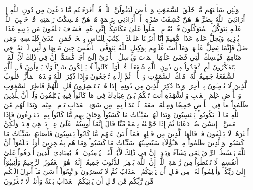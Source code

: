 وَلَئِن سَأَلۡتَهُم مَّنۡ خَلَقَ ٱلسَّمَٰوَٰتِ وَٱلۡأَرۡضَ لَيَقُولُنَّ ٱللَّهُۚ قُلۡ أَفَرَءَيۡتُم مَّا تَدۡعُونَ مِن دُونِ ٱللَّهِ إِنۡ أَرَادَنِيَ ٱللَّهُ بِضُرٍّ هَلۡ هُنَّ كَٰشِفَٰتُ ضُرِّهِۦٓ أَوۡ أَرَادَنِي بِرَحۡمَةٍ هَلۡ هُنَّ مُمۡسِكَٰتُ رَحۡمَتِهِۦۚ قُلۡ حَسۡبِيَ ٱللَّهُۖ عَلَيۡهِ يَتَوَكَّلُ ٱلۡمُتَوَكِّلُونَ
قُلۡ يَٰقَوۡمِ ٱعۡمَلُواْ عَلَىٰ مَكَانَتِكُمۡ إِنِّي عَٰمِلٞۖ فَسَوۡفَ تَعۡلَمُونَ
مَن يَأۡتِيهِ عَذَابٞ يُخۡزِيهِ وَيَحِلُّ عَلَيۡهِ عَذَابٞ مُّقِيمٌ
إِنَّآ أَنزَلۡنَا عَلَيۡكَ ٱلۡكِتَٰبَ لِلنَّاسِ بِٱلۡحَقِّۖ فَمَنِ ٱهۡتَدَىٰ فَلِنَفۡسِهِۦۖ وَمَن ضَلَّ فَإِنَّمَا يَضِلُّ عَلَيۡهَاۖ وَمَآ أَنتَ عَلَيۡهِم بِوَكِيلٍ
ٱللَّهُ يَتَوَفَّى ٱلۡأَنفُسَ حِينَ مَوۡتِهَا وَٱلَّتِي لَمۡ تَمُتۡ فِي مَنَامِهَاۖ فَيُمۡسِكُ ٱلَّتِي قَضَىٰ عَلَيۡهَا ٱلۡمَوۡتَ وَيُرۡسِلُ ٱلۡأُخۡرَىٰٓ إِلَىٰٓ أَجَلٖ مُّسَمًّىۚ إِنَّ فِي ذَٰلِكَ لَأٓيَٰتٖ لِّقَوۡمٖ يَتَفَكَّرُونَ
أَمِ ٱتَّخَذُواْ مِن دُونِ ٱللَّهِ شُفَعَآءَۚ قُلۡ أَوَلَوۡ كَانُواْ لَا يَمۡلِكُونَ شَيۡـٔٗا وَلَا يَعۡقِلُونَ
قُل لِّلَّهِ ٱلشَّفَٰعَةُ جَمِيعٗاۖ لَّهُۥ مُلۡكُ ٱلسَّمَٰوَٰتِ وَٱلۡأَرۡضِۖ ثُمَّ إِلَيۡهِ تُرۡجَعُونَ
وَإِذَا ذُكِرَ ٱللَّهُ وَحۡدَهُ ٱشۡمَأَزَّتۡ قُلُوبُ ٱلَّذِينَ لَا يُؤۡمِنُونَ بِٱلۡأٓخِرَةِۖ وَإِذَا ذُكِرَ ٱلَّذِينَ مِن دُونِهِۦٓ إِذَا هُمۡ يَسۡتَبۡشِرُونَ
قُلِ ٱللَّهُمَّ فَاطِرَ ٱلسَّمَٰوَٰتِ وَٱلۡأَرۡضِ عَٰلِمَ ٱلۡغَيۡبِ وَٱلشَّهَٰدَةِ أَنتَ تَحۡكُمُ بَيۡنَ عِبَادِكَ فِي مَا كَانُواْ فِيهِ يَخۡتَلِفُونَ
وَلَوۡ أَنَّ لِلَّذِينَ ظَلَمُواْ مَا فِي ٱلۡأَرۡضِ جَمِيعٗا وَمِثۡلَهُۥ مَعَهُۥ لَٱفۡتَدَوۡاْ بِهِۦ مِن سُوٓءِ ٱلۡعَذَابِ يَوۡمَ ٱلۡقِيَٰمَةِۚ وَبَدَا لَهُم مِّنَ ٱللَّهِ مَا لَمۡ يَكُونُواْ يَحۡتَسِبُونَ
وَبَدَا لَهُمۡ سَيِّـَٔاتُ مَا كَسَبُواْ وَحَاقَ بِهِم مَّا كَانُواْ بِهِۦ يَسۡتَهۡزِءُونَ
فَإِذَا مَسَّ ٱلۡإِنسَٰنَ ضُرّٞ دَعَانَا ثُمَّ إِذَا خَوَّلۡنَٰهُ نِعۡمَةٗ مِّنَّا قَالَ إِنَّمَآ أُوتِيتُهُۥ عَلَىٰ عِلۡمِۭۚ بَلۡ هِيَ فِتۡنَةٞ وَلَٰكِنَّ أَكۡثَرَهُمۡ لَا يَعۡلَمُونَ
قَدۡ قَالَهَا ٱلَّذِينَ مِن قَبۡلِهِمۡ فَمَآ أَغۡنَىٰ عَنۡهُم مَّا كَانُواْ يَكۡسِبُونَ
فَأَصَابَهُمۡ سَيِّـَٔاتُ مَا كَسَبُواْۚ وَٱلَّذِينَ ظَلَمُواْ مِنۡ هَـٰٓؤُلَآءِ سَيُصِيبُهُمۡ سَيِّـَٔاتُ مَا كَسَبُواْ وَمَا هُم بِمُعۡجِزِينَ
أَوَلَمۡ يَعۡلَمُوٓاْ أَنَّ ٱللَّهَ يَبۡسُطُ ٱلرِّزۡقَ لِمَن يَشَآءُ وَيَقۡدِرُۚ إِنَّ فِي ذَٰلِكَ لَأٓيَٰتٖ لِّقَوۡمٖ يُؤۡمِنُونَ
۞قُلۡ يَٰعِبَادِيَ ٱلَّذِينَ أَسۡرَفُواْ عَلَىٰٓ أَنفُسِهِمۡ لَا تَقۡنَطُواْ مِن رَّحۡمَةِ ٱللَّهِۚ إِنَّ ٱللَّهَ يَغۡفِرُ ٱلذُّنُوبَ جَمِيعًاۚ إِنَّهُۥ هُوَ ٱلۡغَفُورُ ٱلرَّحِيمُ
وَأَنِيبُوٓاْ إِلَىٰ رَبِّكُمۡ وَأَسۡلِمُواْ لَهُۥ مِن قَبۡلِ أَن يَأۡتِيَكُمُ ٱلۡعَذَابُ ثُمَّ لَا تُنصَرُونَ
وَٱتَّبِعُوٓاْ أَحۡسَنَ مَآ أُنزِلَ إِلَيۡكُم مِّن رَّبِّكُم مِّن قَبۡلِ أَن يَأۡتِيَكُمُ ٱلۡعَذَابُ بَغۡتَةٗ وَأَنتُمۡ لَا تَشۡعُرُونَ
